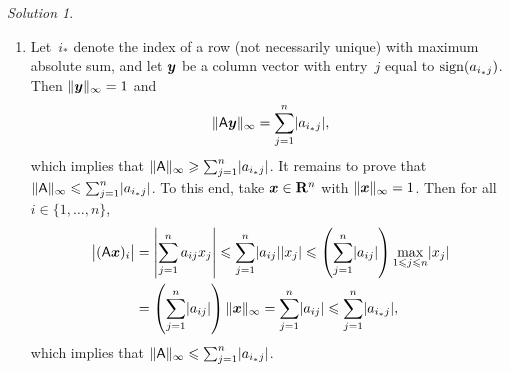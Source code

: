 \documentclass[11pt]{article}
\theoremstyle{definition}
\theoremstyle{remark}
\newtheorem*{protosolution}{Solution}
\newenvironment{solutionframe}
{%
    \begin{mdframed}[
        leftmargin=1cm,
        skipabove=.3cm,
        linecolor=blue,
        backgroundcolor=lightgreen,
        linewidth=0pt,
        innerleftmargin=.5em,
        innerrightmargin=.5em,
        innertopmargin=.3em,
        innerbottommargin=.6em,
    ]
}
{
    \end{mdframed}
}
\newenvironment{solution}
{\pushQED{\qed}\renewcommand{\qedsymbol}{$\triangle$}
\begin{solutionframe}\small \begin{protosolution}}
{\popQED\end{protosolution}\end{solutionframe}}
\begin{document}
\begin{solution}
\begin{enumerate}
        \item
            Let~$i_*$ denote the index of a row (not necessarily unique) with maximum absolute sum,
            and let $\mathbf{\boldsymbol{y}}$ be a column vector with entry~$j$ equal to $\operatorname{sign}(a_{i_* j})$.
            Then $\lVert\mathbf{\boldsymbol{y}}\rVert_{\infty} = 1$ and
            \[
                \lVert\mathsf A \mathbf{\boldsymbol{y}}\rVert_{\infty} = \sum_{j=1}^{n} \lvert a_{i_* j}\rvert,
            \]
            which implies that $\lVert\mathsf A\rVert_{\infty} \geqslant \sum_{j=1}^{n} \lvert a_{i_* j}\rvert$.
            It remains to prove that $\lVert\mathsf A\rVert_{\infty} \leqslant \sum_{j=1}^{n} \lvert a_{i_* j}\rvert$.
            To this end, take $\mathbf{\boldsymbol{x}} \in \mathbf R^n$ with $\lVert\mathbf{\boldsymbol{x}}\rVert_{\infty} = 1$.
            Then for all $i \in \{1, \dotsc, n\}$,
            \begin{align*}
                \bigl\lvert (\mathsf A \mathbf{\boldsymbol{x}})_i \bigr\rvert
                &= \left\lvert \sum_{j=1}^{n} a_{ij} x_j \right\rvert
                \leqslant \sum_{j=1}^{n} \lvert a_{ij} \rvert \lvert x_j \rvert
                \leqslant \left( \sum_{j=1}^{n} \lvert a_{ij} \rvert \right) \max_{1\leqslant j \leqslant n} \lvert x_j\rvert \\
                &= \left( \sum_{j=1}^{n} \lvert a_{ij} \rvert \right) \lVert\mathbf{\boldsymbol{x}}\rVert_{\infty}
                = \sum_{j=1}^{n} \lvert a_{i j} \rvert
                \leqslant \sum_{j=1}^{n} \lvert a_{i_* j} \rvert,
            \end{align*}
            which implies that $\lVert\mathsf A\rVert_{\infty} \leqslant \sum_{j=1}^{n} \lvert a_{i_* j} \rvert$.
    \end{enumerate}
\end{solution}
\end{document}
